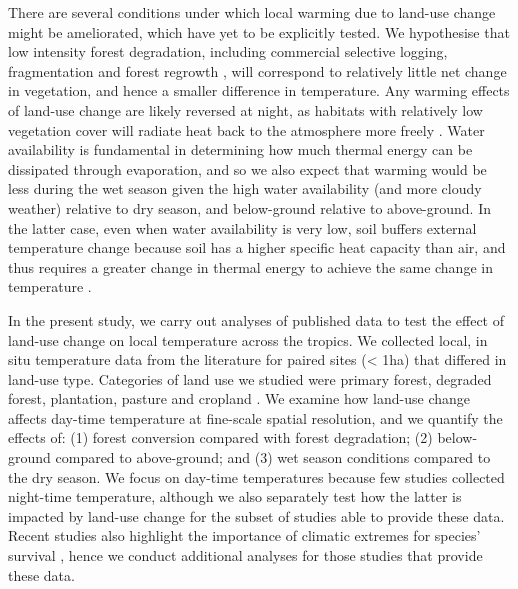 \documentclass[12pt,a4paper,]{report}
\theoremstyle{definition}
\theoremstyle{definition}
\theoremstyle{definition}
\theoremstyle{remark}
\begin{document}
There are several conditions under which local warming due to land-use
change might be ameliorated, which have yet to be explicitly tested. We
hypothesise that low intensity forest degradation, including commercial
selective logging, fragmentation and forest regrowth
\citep{lewis_increasing_2015}, will correspond to relatively little net
change in vegetation, and hence a smaller difference in temperature. Any
warming effects of land-use change are likely reversed at night, as
habitats with relatively low vegetation cover will radiate heat back to
the atmosphere more freely
\citep{oke_boundary_1987, chen_growing-season_1995}. Water availability
is fundamental in determining how much thermal energy can be dissipated
through evaporation, and so we also expect that warming would be less
during the wet season given the high water availability (and more cloudy
weather) relative to dry season, and below-ground relative to
above-ground. In the latter case, even when water availability is very
low, soil buffers external temperature change
\citep{scheffers_microhabitats_2014-1} because soil has a higher
specific heat capacity than air, and thus requires a greater change in
thermal energy to achieve the same change in temperature
\citep{oke_boundary_1987}.

In the present study, we carry out analyses of published data to test
the effect of land-use change on local temperature across the tropics.
We collected local, in situ temperature data from the literature for
paired sites (\textless{} 1ha) that differed in land-use type.
Categories of land use we studied were primary forest, degraded forest,
plantation, pasture and cropland \citep[\autoref{tab:tab-2-1}; modified
from Extended Data Table 1 in][]{newbold_global_2015}. We examine how
land-use change affects day-time temperature at fine-scale spatial
resolution, and we quantify the effects of: (1) forest conversion
compared with forest degradation; (2) below-ground compared to
above-ground; and (3) wet season conditions compared to the dry season.
We focus on day-time temperatures because few studies collected
night-time temperature, although we also separately test how the latter
is impacted by land-use change for the subset of studies able to provide
these data. Recent studies also highlight the importance of climatic
extremes for species' survival
\citep[e.g.][]{deutsch_impacts_2008, christidis_role_2013}, hence we
conduct additional analyses for those studies that provide these data.
\end{document}
